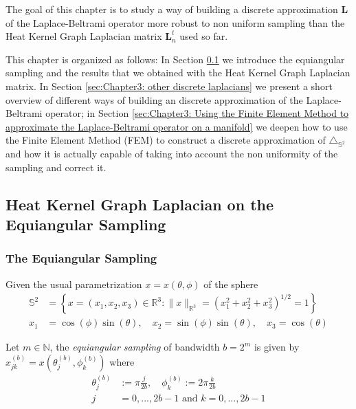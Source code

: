 The goal of this chapter is to study a way of building a discrete approximation $\mathbf L$ of the Laplace-Beltrami operator more robust to non uniform sampling than the Heat Kernel Graph Laplacian matrix $\mathbf L_n^t$ used so far.

This chapter is organized as follows: In Section \ref{sec:Chapter3: Heat Kernel Graph Laplacian on the Equiangular Sampling} we introduce the equiangular sampling and the results that we obtained with the Heat Kernel Graph Laplacian matrix. In Section \ref{sec:Chapter3: other discrete laplacians} we present a short overview of different ways of building an discrete approximation of the Laplace-Beltrami operator; in Section \ref{sec:Chapter3: Using the Finite Element Method to approximate the Laplace-Beltrami operator on a manifold} we deepen how to use the Finite Element Method (FEM) to construct a discrete approximation of $\triangle_{\mathbb S^2}$ and how it is actually capable of taking into account the non uniformity of the sampling and correct it.
\subsection{Heat Kernel Graph Laplacian on the Equiangular Sampling}
\label{sec:Chapter3: Heat Kernel Graph Laplacian on the Equiangular Sampling}

\subsubsection{The Equiangular Sampling}

Given the usual parametrization $x = x(\theta, \phi)$ of the sphere
\begin{align*}
	\mathbb{S}^{2}&=\left\{x=\left(x_{1}, x_{2}, x_{3}\right) \in \mathbb{R}^{3} :\|x\|_{\mathbb{R}^{3}}=\left(x_{1}^{2}+x_{2}^{2}+x_{3}^{2}\right)^{1 / 2}=1\right\}\\
	x_{1}&=\cos (\phi) \sin (\theta), \quad x_{2}=\sin (\phi) \sin (\theta), \quad x_{3}=\cos (\theta)
\end{align*}

Let $m\in\mathbb N$, the \textit{equiangular sampling} of bandwidth $b=2^m$ is given by 
$
x_{j k}^{(b)}=x\left(\theta_{j}^{(b)}, \phi_{k}^{(b)}\right)
$
where
\begin{align*}
	\theta_{j}^{(b)} &:=\pi \frac{j}{2 b}, \quad \phi_{k}^{(b)} :=2 \pi \frac{k}{2 b}\\
	j&=0, ..., 2b-1 \text{ and }k=0, ..., 2b-1 
\end{align*}

